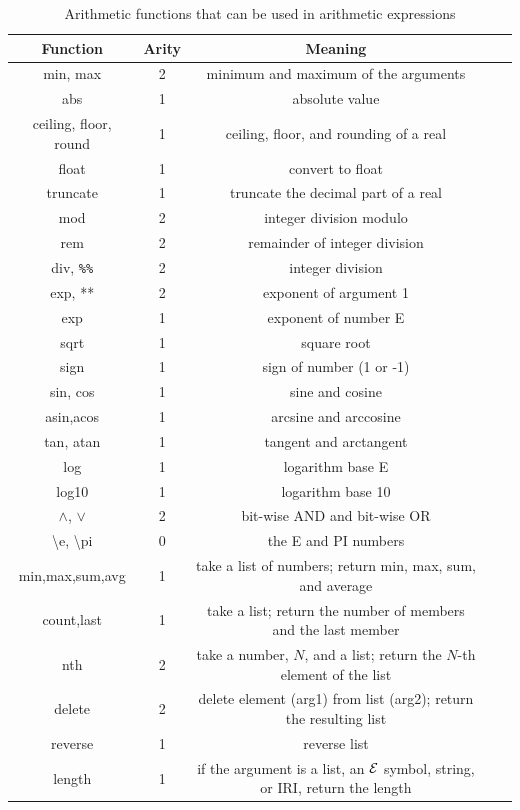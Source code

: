 \documentclass[11pt]{article}
\newcommand{\ERGO}{\mbox{\ensuremath{\cal{E}}\smaller{{\sc{RGO}}}}\xspace}
\newcommand{\FLSYSTEM}{\ERGO}
\newcommand{\bs}{\textbackslash}
\begin{document}
\begin{table}[tbh]
  \center
{ \footnotesize
\begin{tabular}{|c|c|c|c|c|}
\hline
Function  & Arity & Meaning  \\ \hline
min, max & 2 & minimum and maximum of the arguments\\
abs & 1 & absolute value \\
ceiling, floor, round & 1 & ceiling, floor, and rounding of a real \\
float & 1 & convert to float \\
truncate & 1 & truncate the decimal part of a real \\
mod & 2 & integer division modulo \\
rem & 2 & remainder of integer division\\
div, \texttt{\%\%} & 2 & integer division\\
exp, ** & 2 & exponent of argument 1\\
exp & 1 & exponent of number E\\
sqrt & 1 & square root\\
sign & 1 & sign of number (1 or -1)\\
sin, cos & 1 & sine and cosine \\
asin,acos & 1 & arcsine and arccosine\\ 
tan, atan & 1 & tangent and arctangent \\
log & 1 & logarithm base E \\
log10 & 1 & logarithm base 10 \\
$\wedge$, $\vee$ & 2 & bit-wise AND and bit-wise OR \\
\bs{}e, \bs{}pi & 0 & the E and PI numbers\\
  min,max,sum,avg& 1 & take a list of numbers; return min, max,
  sum, and average
  \\
  count,last & 1 & take a list; return the number of members and the last
  member
  \\
  nth & 2 & take a number, $N$, and a list; return the $N$-th element of
  the list
  \\
  delete & 2 & delete element (arg1) from list (arg2); return the resulting list
  \\
  reverse & 1& reverse list
  \\
  length & 1& if the argument is a list, an \FLSYSTEM symbol, string, or IRI,
  return the length
  \\
\hline
\end{tabular}
}
\caption{Arithmetic functions that can be used in arithmetic expressions}
\label{tab:arith-funcs}
\end{table}
\end{document}
